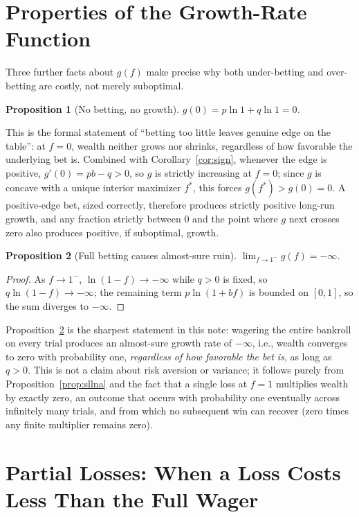 \documentclass[11pt]{article}
\newtheorem{proposition}{Proposition}
\theoremstyle{remark}
\theoremstyle{definition}
\begin{document}
\section{Properties of the Growth-Rate Function}
\label{sec:properties}

Three further facts about $g(f)$ make precise why both under-betting and over-betting are costly, not merely suboptimal.

\begin{proposition}[No betting, no growth]
$g(0) = p\ln 1 + q \ln 1 = 0$.
\end{proposition}

This is the formal statement of ``betting too little leaves genuine edge on the table'': at $f=0$, wealth neither grows nor shrinks, regardless of how favorable the underlying bet is. Combined with Corollary~\ref{cor:sign}, whenever the edge is positive, $g'(0)=pb-q>0$, so $g$ is strictly increasing at $f=0$; since $g$ is concave with a unique interior maximizer $f^*$, this forces $g(f^*)>g(0)=0$. A positive-edge bet, sized correctly, therefore produces strictly positive long-run growth, and any fraction strictly between $0$ and the point where $g$ next crosses zero also produces positive, if suboptimal, growth.

\begin{proposition}[Full betting causes almost-sure ruin]
\label{prop:ruin}
$\displaystyle\lim_{f\to 1^{-}} g(f) = -\infty$.
\end{proposition}
\begin{proof}
As $f\to1^-$, $\ln(1-f)\to-\infty$ while $q>0$ is fixed, so $q\ln(1-f)\to-\infty$; the remaining term $p\ln(1+bf)$ is bounded on $[0,1]$, so the sum diverges to $-\infty$.
\end{proof}

Proposition~\ref{prop:ruin} is the sharpest statement in this note: wagering the entire bankroll on every trial produces an almost-sure growth rate of $-\infty$, i.e., wealth converges to zero with probability one, \emph{regardless of how favorable the bet is}, as long as $q>0$. This is not a claim about risk aversion or variance; it follows purely from Proposition~\ref{prop:sllna} and the fact that a single loss at $f=1$ multiplies wealth by exactly zero, an outcome that occurs with probability one eventually across infinitely many trials, and from which no subsequent win can recover (zero times any finite multiplier remains zero).

\section{Partial Losses: When a Loss Costs Less Than the Full Wager}
\label{sec:partial-loss}
\end{document}
